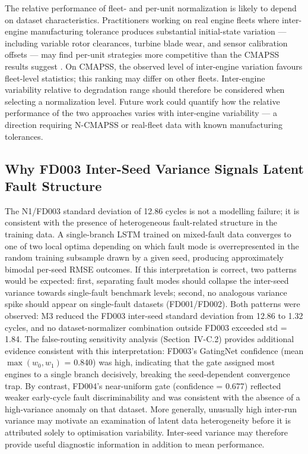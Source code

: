 \documentclass[review,12pt]{elsarticle}
\begin{document}
The relative performance of fleet- and per-unit normalization is likely to depend on dataset characteristics. Practitioners working on real engine fleets where inter-engine manufacturing tolerance produces substantial initial-state variation — including variable rotor clearances, turbine blade wear, and sensor calibration offsets — may find per-unit strategies more competitive than the CMAPSS results suggest \cite{ref29}. On CMAPSS, the observed level of inter-engine variation favours fleet-level statistics; this ranking may differ on other fleets. Inter-engine variability relative to degradation range should therefore be considered when selecting a normalization level. Future work could quantify how the relative performance of the two approaches varies with inter-engine variability --- a direction requiring N-CMAPSS or real-fleet data with known manufacturing tolerances.

\subsection{Why FD003 Inter-Seed Variance Signals Latent Fault Structure}

The N1/FD003 standard deviation of 12.86 cycles is not a modelling failure; it is consistent with the presence of heterogeneous fault-related structure in the training data. A single-branch LSTM trained on mixed-fault data converges to one of two local optima depending on which fault mode is overrepresented in the random training subsample drawn by a given seed, producing approximately bimodal per-seed RMSE outcomes. If this interpretation is correct, two patterns would be expected: first, separating fault modes should collapse the inter-seed variance towards single-fault benchmark levels; second, no analogous variance spike should appear on single-fault datasets (FD001/FD002). Both patterns were observed: M3 reduced the FD003 inter-seed standard deviation from 12.86 to 1.32 cycles, and no dataset-normalizer combination outside FD003 exceeded std = 1.84. The false-routing sensitivity analysis (Section~IV-C.2) provides additional evidence consistent with this interpretation: FD003's GatingNet confidence (mean $\max(w_0, w_1)$ = 0.840) was high, indicating that the gate assigned most engines to a single branch decisively, breaking the seed-dependent convergence trap. By contrast, FD004's near-uniform gate (confidence = 0.677) reflected weaker early-cycle fault discriminability and was consistent with the absence of a high-variance anomaly on that dataset. More generally, unusually high inter-run variance may motivate an examination of latent data heterogeneity before it is attributed solely to optimisation variability. Inter-seed variance may therefore provide useful diagnostic information in addition to mean performance.
\end{document}
